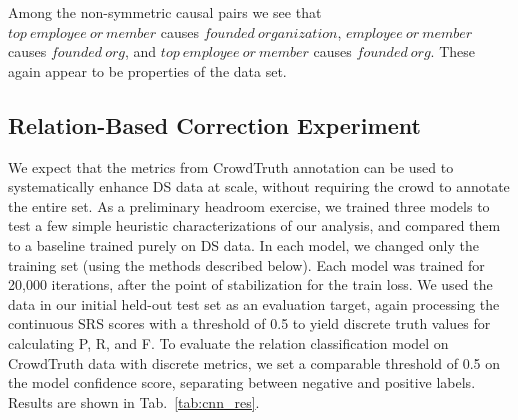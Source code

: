 Among the non-symmetric causal pairs we see that \\ $top\ employee\ or\ member$ causes $founded\ organization$, $employee\ or\ member$ causes $founded\ org$, and $top\ employee\ or\ member$ causes $founded\ org$.  These again appear to be properties of the data set.


\subsection{Relation-Based Correction Experiment}

We expect that the metrics from CrowdTruth annotation can be used to systematically enhance DS data at scale, without requiring the crowd to annotate the entire set.  As a preliminary headroom exercise, we trained three models to test a few simple heuristic characterizations of our analysis, and compared them to a baseline trained purely on DS data. In each model, we changed only the training set (using the methods described below). Each model was trained for 20,000 iterations, after the point of stabilization for the train loss. We used the data in our initial held-out test set as an evaluation target, again processing the continuous SRS scores with a threshold of 0.5 to yield discrete truth values for calculating P, R, and F. To evaluate the relation classification model on CrowdTruth data with discrete metrics, we set a comparable threshold of 0.5 on the model confidence score, separating between negative and positive labels. Results are shown in Tab.~\ref{tab:cnn_res}.

